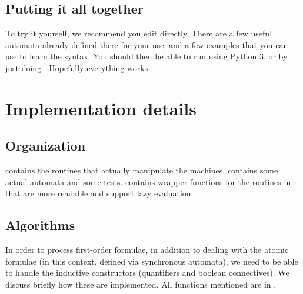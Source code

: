 \documentclass{hw}
\begin{document}
\subsection*{Putting it all together}
To try it yourself, we recommend you edit  directly. There are a few useful
automata already defined there for your use, and a few examples that you can use to learn
the syntax. You should then be able to run  using Python 3, or by just doing
.
Hopefully everything works.

\section*{Implementation details}
\subsection*{Organization}
 contains the routines that actually manipulate the machines. 
contains some actual automata and some tests.  contains wrapper functions
for the routines in  that are more readable and support lazy evaluation.

\subsection*{Algorithms}
In order to process first-order formulae, in addition to dealing with the atomic
formulae (in this context, defined via synchronous automata), we need to be able
to handle the inductive constructors (quantifiers and boolean connectives). We
discuss briefly how these are implemented. All functions mentioned are in .
\end{document}
